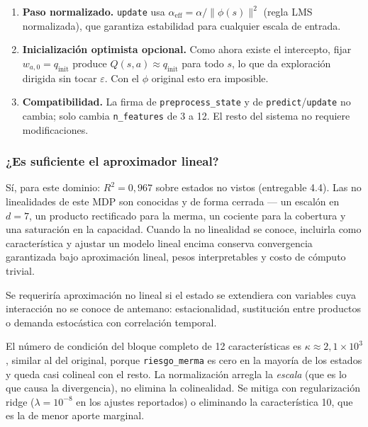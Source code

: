 \documentclass[11pt,letterpaper]{article}
\begin{document}
\begin{enumerate}[leftmargin=*]
  \item \textbf{Paso normalizado.} \texttt{update} usa
  $\alpha_{\text{eff}} = \alpha / \lVert\phi(s)\rVert^{2}$ (regla LMS normalizada),
  que garantiza estabilidad para cualquier escala de entrada.
  \item \textbf{Inicialización optimista opcional.} Como ahora existe el intercepto,
  fijar $w_{a,0} = q_{\text{init}}$ produce $Q(s,a) \approx q_{\text{init}}$ para
  todo $s$, lo que da exploración dirigida sin tocar $\varepsilon$. Con el $\phi$
  original esto era imposible.
  \item \textbf{Compatibilidad.} La firma de \texttt{preprocess\_state} y de
  \texttt{predict}/\texttt{update} no cambia; solo cambia \texttt{n\_features} de 3
  a 12. El resto del sistema no requiere modificaciones.
\end{enumerate}

\subsubsection*{¿Es suficiente el aproximador lineal?}

Sí, para este dominio: $R^2 = 0{,}967$ sobre estados no vistos (entregable 4.4).
Las no linealidades de este MDP son conocidas y de forma cerrada --- un escalón en
$d = 7$, un producto rectificado para la merma, un cociente para la cobertura y una
saturación en la capacidad. Cuando la no linealidad se conoce, incluirla como
característica y ajustar un modelo lineal encima conserva convergencia garantizada
bajo aproximación lineal, pesos interpretables y costo de cómputo trivial.

Se requeriría aproximación no lineal si el estado se extendiera con variables cuya
interacción no se conoce de antemano: estacionalidad, sustitución entre productos o
demanda estocástica con correlación temporal.

El número de condición del bloque completo de 12 características es
$\kappa \approx 2{,}1\times10^{3}$, similar al del original, porque
\texttt{riesgo\_merma} es cero en la mayoría de los estados y queda casi colineal con
el resto. La normalización arregla la \emph{escala} (que es lo que causa la
divergencia), no elimina la colinealidad. Se mitiga con regularización ridge
($\lambda = 10^{-8}$ en los ajustes reportados) o eliminando la característica 10,
que es la de menor aporte marginal.

\end{document}
